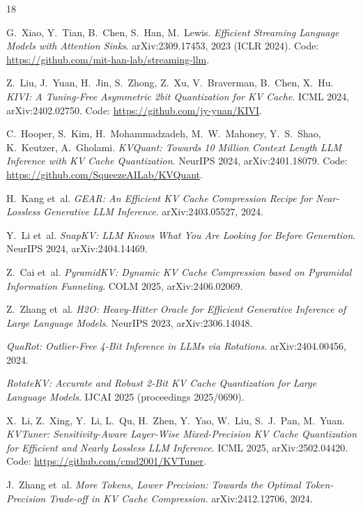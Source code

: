 \documentclass[10pt,twocolumn]{article}
\begin{document}
\begin{thebibliography}{18}
\setlength{\itemsep}{0pt}\footnotesize

G.~Xiao, Y.~Tian, B.~Chen, S.~Han, M.~Lewis.
\emph{Efficient Streaming Language Models with Attention Sinks}.
arXiv:2309.17453, 2023 (ICLR 2024). Code: \url{https://github.com/mit-han-lab/streaming-llm}.

Z.~Liu, J.~Yuan, H.~Jin, S.~Zhong, Z.~Xu, V.~Braverman, B.~Chen, X.~Hu.
\emph{KIVI: A Tuning-Free Asymmetric 2bit Quantization for KV Cache}.
ICML 2024, arXiv:2402.02750. Code: \url{https://github.com/jy-yuan/KIVI}.

C.~Hooper, S.~Kim, H.~Mohammadzadeh, M.~W.~Mahoney, Y.~S.~Shao, K.~Keutzer, A.~Gholami.
\emph{KVQuant: Towards 10 Million Context Length LLM Inference with KV Cache Quantization}.
NeurIPS 2024, arXiv:2401.18079. Code: \url{https://github.com/SqueezeAILab/KVQuant}.

H.~Kang et~al.
\emph{GEAR: An Efficient KV Cache Compression Recipe for Near-Lossless Generative LLM Inference}.
arXiv:2403.05527, 2024.

Y.~Li et~al.
\emph{SnapKV: LLM Knows What You Are Looking for Before Generation}.
NeurIPS 2024, arXiv:2404.14469.

Z.~Cai et~al.
\emph{PyramidKV: Dynamic KV Cache Compression based on Pyramidal Information Funneling}.
COLM 2025, arXiv:2406.02069.

Z.~Zhang et~al.
\emph{H2O: Heavy-Hitter Oracle for Efficient Generative Inference of Large Language Models}.
NeurIPS 2023, arXiv:2306.14048.

\emph{QuaRot: Outlier-Free 4-Bit Inference in LLMs via Rotations}.
arXiv:2404.00456, 2024.

\emph{RotateKV: Accurate and Robust 2-Bit KV Cache Quantization for Large Language Models}.
IJCAI 2025 (proceedings 2025/0690).

X.~Li, Z.~Xing, Y.~Li, L.~Qu, H.~Zhen, Y.~Yao, W.~Liu, S.~J.~Pan, M.~Yuan.
\emph{KVTuner: Sensitivity-Aware Layer-Wise Mixed-Precision KV Cache Quantization for Efficient and Nearly Lossless LLM Inference}.
ICML 2025, arXiv:2502.04420. Code: \url{https://github.com/cmd2001/KVTuner}.

J.~Zhang et~al.
\emph{More Tokens, Lower Precision: Towards the Optimal Token-Precision Trade-off in KV Cache Compression}.
arXiv:2412.12706, 2024.


\end{thebibliography}
\end{document}
